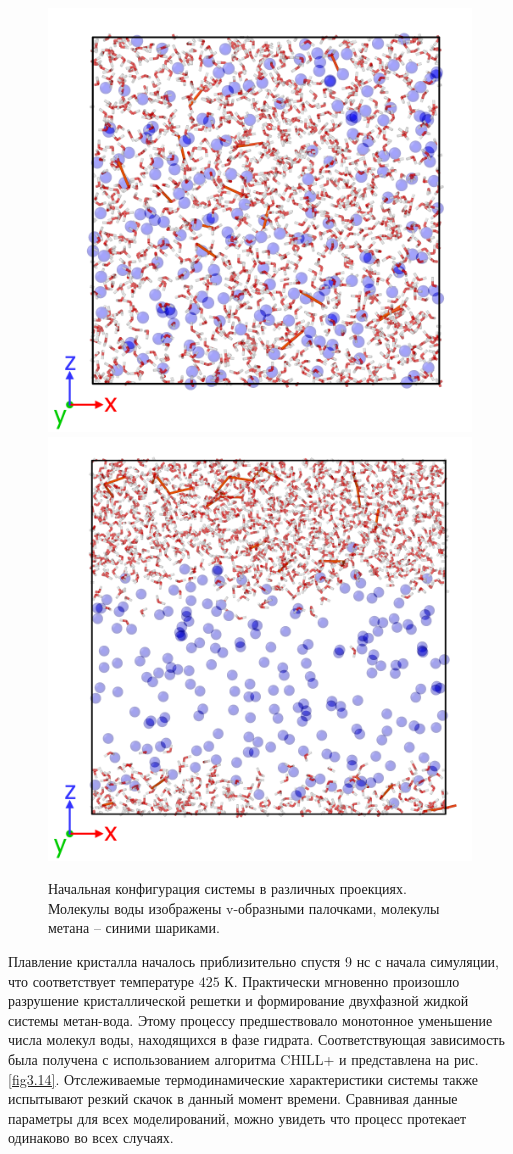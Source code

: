 \begin{figure}[H]
    \centering
    \begin{minipage}{\linewidth}
        \includegraphics[width=.5\linewidth]{figures/tip4p_melt7.png}\hfill
        \includegraphics[width=.5\linewidth]{figures/tip4p_melt8.png}
    \end{minipage}
    \caption{Начальная конфигурация системы в различных проекциях. Молекулы воды изображены v-образными палочками, молекулы метана -- синими шариками.}
    \label{fig3.12}
\end{figure}

Плавление кристалла началось приблизительно спустя 9 нс с начала симуляции, что соответствует температуре $425$ К. Практически мгновенно произошло разрушение кристаллической решетки и формирование двухфазной жидкой системы метан-вода. Этому процессу предшествовало монотонное уменьшение числа молекул воды, находящихся в фазе гидрата. Соответствующая зависимость была получена с использованием алгоритма CHILL+ и представлена на рис. \ref{fig3.14}. Отслеживаемые термодинамические характеристики системы также испытывают резкий скачок в данный момент времени. Сравнивая данные параметры для всех моделирований, можно увидеть что процесс протекает одинаково во всех случаях.

